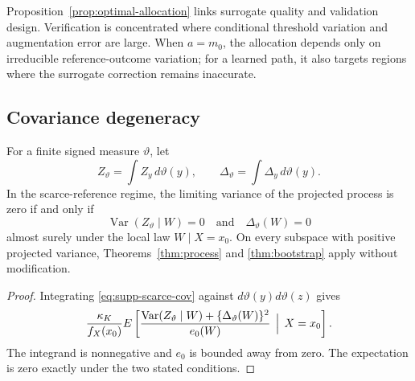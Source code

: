 Proposition~\ref{prop:optimal-allocation} links surrogate quality and validation design. Verification is concentrated where conditional threshold variation and augmentation error are large. When \(a=m_0\), the allocation depends only on irreducible reference-outcome variation; for a learned path, it also targets regions where the surrogate correction remains inaccurate.

\subsection{Covariance degeneracy}

\begin{proposition}
\label{prop:degenerate-directions}
For a finite signed measure \(\vartheta\), let
\[
Z_\vartheta=\int Z_y\,d\vartheta(y),
\qquad
\Delta_\vartheta=\int \Delta_y\,d\vartheta(y).
\]
In the scarce-reference regime, the limiting variance of the projected process is zero if and only if
\[
\operatorname{Var}(Z_\vartheta\mid W)=0
\quad\text{and}\quad
\Delta_\vartheta(W)=0
\]
almost surely under the local law \(W\mid X=x_0\). On every subspace with positive projected variance, Theorems~\ref{thm:process} and \ref{thm:bootstrap} apply without modification.
\end{proposition}

\begin{proof}
Integrating \eqref{eq:supp-scarce-cov} against \(d\vartheta(y)d\vartheta(z)\) gives
\[
\frac{\kappa_K}{f_X(x_0)}
E\left[
\frac{\operatorname{Var}(Z_\vartheta\mid W)+\{\Delta_\vartheta(W)\}^2}{e_0(W)}
\,\Bigm|\,X=x_0
\right].
\]
The integrand is nonnegative and \(e_0\) is bounded away from zero. The expectation is zero exactly under the two stated conditions.
\end{proof}
